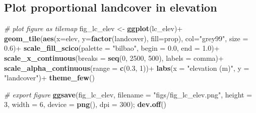 \documentclass[]{article}
\newenvironment{Shaded}{}{}
\newcommand{\CommentTok}[1]{\textcolor[rgb]{0.38,0.63,0.69}{\textit{#1}}}
\newcommand{\DataTypeTok}[1]{\textcolor[rgb]{0.56,0.13,0.00}{#1}}
\newcommand{\DecValTok}[1]{\textcolor[rgb]{0.25,0.63,0.44}{#1}}
\newcommand{\FloatTok}[1]{\textcolor[rgb]{0.25,0.63,0.44}{#1}}
\newcommand{\KeywordTok}[1]{\textcolor[rgb]{0.00,0.44,0.13}{\textbf{#1}}}
\newcommand{\NormalTok}[1]{#1}
\newcommand{\OperatorTok}[1]{\textcolor[rgb]{0.40,0.40,0.40}{#1}}
\newcommand{\StringTok}[1]{\textcolor[rgb]{0.25,0.44,0.63}{#1}}
\begin{document}
\hypertarget{plot-proportional-landcover-in-elevation}{%
\subsection{Plot proportional landcover in elevation}\label{plot-proportional-landcover-in-elevation}}

\begin{Shaded}
\begin{Highlighting}[]
\CommentTok{# plot figure as tilemap}
\NormalTok{fig_lc_elev <-}\StringTok{ }\KeywordTok{ggplot}\NormalTok{(lc_elev)}\OperatorTok{+}
\StringTok{  }\KeywordTok{geom_tile}\NormalTok{(}\KeywordTok{aes}\NormalTok{(}\DataTypeTok{x=}\NormalTok{elev, }\DataTypeTok{y=}\KeywordTok{factor}\NormalTok{(landcover), }
                \DataTypeTok{fill=}\NormalTok{prop), }
            \DataTypeTok{col=}\StringTok{"grey99"}\NormalTok{, }\DataTypeTok{size =} \FloatTok{0.6}\NormalTok{)}\OperatorTok{+}
\StringTok{  }\KeywordTok{scale_fill_scico}\NormalTok{(}\DataTypeTok{palette =} \StringTok{"bilbao"}\NormalTok{, }\DataTypeTok{begin =} \FloatTok{0.0}\NormalTok{, }\DataTypeTok{end =} \FloatTok{1.0}\NormalTok{)}\OperatorTok{+}
\StringTok{  }\KeywordTok{scale_x_continuous}\NormalTok{(}\DataTypeTok{breaks =} \KeywordTok{seq}\NormalTok{(}\DecValTok{0}\NormalTok{, }\DecValTok{2500}\NormalTok{, }\DecValTok{500}\NormalTok{), }\DataTypeTok{labels =}\NormalTok{ comma)}\OperatorTok{+}
\StringTok{  }\KeywordTok{scale_alpha_continuous}\NormalTok{(}\DataTypeTok{range =} \KeywordTok{c}\NormalTok{(}\FloatTok{0.3}\NormalTok{, }\DecValTok{1}\NormalTok{))}\OperatorTok{+}
\StringTok{  }\KeywordTok{labs}\NormalTok{(}\DataTypeTok{x =} \StringTok{"elevation (m)"}\NormalTok{, }
       \DataTypeTok{y =} \StringTok{"landcover"}\NormalTok{)}\OperatorTok{+}
\StringTok{  }\KeywordTok{theme_few}\NormalTok{()}

\CommentTok{# export figure}
\KeywordTok{ggsave}\NormalTok{(fig_lc_elev, }\DataTypeTok{filename =} \StringTok{"figs/fig_lc_elev.png"}\NormalTok{, }
       \DataTypeTok{height =} \DecValTok{3}\NormalTok{, }\DataTypeTok{width =} \DecValTok{6}\NormalTok{, }\DataTypeTok{device =} \KeywordTok{png}\NormalTok{(), }\DataTypeTok{dpi =} \DecValTok{300}\NormalTok{); }\KeywordTok{dev.off}\NormalTok{()}
\end{Highlighting}
\end{Shaded}
\end{document}
